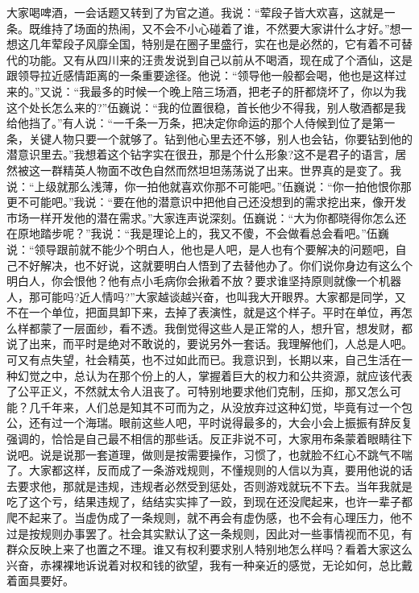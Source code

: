 \documentclass[12pt,oneside]{book}
\begin{document}
大家喝啤酒，一会话题又转到了为官之道。我说：``荤段子皆大欢喜，这就是一条。既维持了场面的热闹，又不会不小心碰着了谁，不然要大家讲什么才好。''想一想这几年荤段子风靡全国，特别是在圈子里盛行，实在也是必然的，它有着不可替代的功能。又有从四川来的汪贵发说到自己以前从不喝酒，现在成了个酒仙，这是跟领导拉近感情距离的一条重要途径。他说：``领导他一般都会喝，他也是这样过来的。''又说：``我最多的时候一个晚上陪三场酒，把老子的肝都烧坏了，你以为我这个处长怎么来的?''伍巍说：``我的位置很稳，首长他少不得我，别人敬酒都是我给他挡了。''有人说：``一千条一万条，把决定你命运的那个人侍候到位了是第一条，关键人物只要一个就够了。钻到他心里去还不够，别人也会钻，你要钻到他的潜意识里去。''我想着这个钻字实在很丑，那是个什么形象?这不是君子的语言，居然被这一群精英人物面不改色自然而然坦坦荡荡说了出来。世界真的是变了。我说：``上级就那么浅薄，你一拍他就喜欢你那不可能吧。''伍巍说：``你一拍他恨你那更不可能吧。''我说：``要在他的潜意识中把他自己还没想到的需求挖出来，像开发市场一样开发他的潜在需求。''大家连声说深刻。伍巍说：``大为你都晓得你怎么还在原地踏步呢？''我说：``我是理论上的，我又不傻，不会做看总会看吧。''伍巍说：``领导跟前就不能少个明白人，他也是人吧，是人也有个要解决的问题吧，自己不好解决，也不好说，这就要明白人悟到了去替他办了。你们说你身边有这么个明白人，你会恨他？他有点小毛病你会揪着不放？要求谁坚持原则就像一个机器人，那可能吗?近人情吗?''大家越谈越兴奋，也叫我大开眼界。大家都是同学，又不在一个单位，把面具卸下来，去掉了表演性，就是这个样子。平时在单位，再怎么样都蒙了一层面纱，看不透。我倒觉得这些人是正常的人，想升官，想发财，都说了出来，而平时是绝对不敢说的，要说另外一套话。我理解他们，人总是人吧。可又有点失望，社会精英，也不过如此而已。我意识到，长期以来，自己生活在一种幻觉之中，总认为在那个份上的人，掌握着巨大的权力和公共资源，就应该代表了公平正义，不然就太令人沮丧了。可特别地要求他们克制，压抑，那又怎么可能？几千年来，人们总是知其不可而为之，从没放弃过这种幻觉，毕竟有过一个包公，还有过一个海瑞。眼前这些人吧，平时说得最多的，大会小会上振振有辞反复强调的，恰恰是自己最不相信的那些话。反正非说不可，大家用布条蒙着眼睛往下说吧。说是说那一套道理，做则是按需要操作，习惯了，也就脸不红心不跳气不喘了。大家都这样，反而成了一条游戏规则，不懂规则的人信以为真，要用他说的话去要求他，那就是违规，违规者必然受到惩处，否则游戏就玩不下去。当年我就是吃了这个亏，结果违规了，结结实实摔了一跤，到现在还没爬起来，也许一辈子都爬不起来了。当虚伪成了一条规则，就不再会有虚伪感，也不会有心理压力，他不过是按规则办事罢了。社会其实默认了这一条规则，因此对一些事情视而不见，有群众反映上来了也置之不理。谁又有权利要求别人特别地怎么样吗？看着大家这么兴奋，赤裸裸地诉说着对权和钱的欲望，我有一种亲近的感觉，无论如何，总比戴着面具要好。
\end{document}
